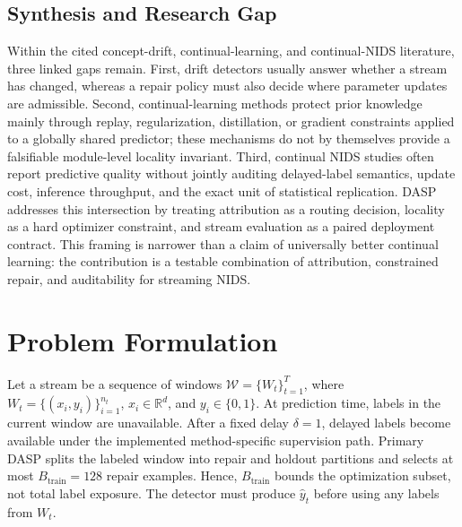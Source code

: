 \documentclass{ieeeaccess}
\begin{document}
\subsection{Synthesis and Research Gap}
Within the cited concept-drift, continual-learning, and continual-NIDS literature, three linked gaps remain. First, drift detectors usually answer whether a stream has changed, whereas a repair policy must also decide where parameter updates are admissible. Second, continual-learning methods protect prior knowledge mainly through replay, regularization, distillation, or gradient constraints applied to a globally shared predictor; these mechanisms do not by themselves provide a falsifiable module-level locality invariant. Third, continual NIDS studies often report predictive quality without jointly auditing delayed-label semantics, update cost, inference throughput, and the exact unit of statistical replication. DASP addresses this intersection by treating attribution as a routing decision, locality as a hard optimizer constraint, and stream evaluation as a paired deployment contract. This framing is narrower than a claim of universally better continual learning: the contribution is a testable combination of attribution, constrained repair, and auditability for streaming NIDS.

\section{Problem Formulation}
\label{sec:problem}

Let a stream be a sequence of windows $\mathcal{W}=\{W_t\}_{t=1}^{T}$, where $W_t=\{(x_i,y_i)\}_{i=1}^{n_t}$, $x_i\in\mathbb{R}^{d}$, and $y_i\in\{0,1\}$. At prediction time, labels in the current window are unavailable. After a fixed delay $\delta=1$, delayed labels become available under the implemented method-specific supervision path. Primary DASP splits the labeled window into repair and holdout partitions and selects at most $B_{\mathrm{train}}=128$ repair examples. Hence, $B_{\mathrm{train}}$ bounds the optimization subset, not total label exposure. The detector must produce $\hat{y}_t$ before using any labels from $W_t$.
\end{document}
